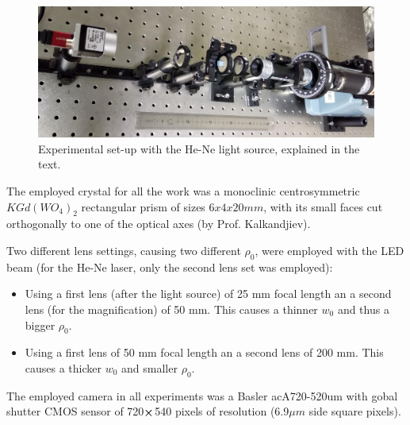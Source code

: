 \documentclass[11pt, a4paper, twoside]{article} %
\begin{document}
\begin{figure}[h!] 
     \centering 
    \includegraphics[width=0.5\linewidth]{setup2.jpg}
    \caption{ Experimental set-up with the He-Ne light source, explained in the text.  }
    \label{fig:track_setup_alt}
\end{figure}

The employed crystal for all the work was a monoclinic centrosymmetric $KGd(WO_4)_2$ rectangular prism of sizes $6x4x20mm$, with its small faces cut orthogonally to one of the optical axes (by Prof. Kalkandjiev).

Two different lens settings, causing two different $\rho_0$, were employed with the LED beam (for the He-Ne laser, only the second lens set was employed):
\begin{itemize}
\item Using a first lens (after the light source) of 25 mm focal length an a second lens (for the magnification) of 50 mm. This causes a thinner $w_0$ and thus a bigger $\rho_0$.
\item  Using a first lens of 50 mm focal length an a second lens of 200 mm. This causes a thicker $w_0$ and smaller $\rho_0$.
\end{itemize}


The employed camera in all experiments was a Basler acA720-520um with gobal shutter CMOS sensor of 720$\cross$540 pixels of resolution (6.9$\mu m$ side square pixels). 


%
%
%
%
%
%
%
%
%
%
%
%
%
%
% 
%
 
\end{document}
